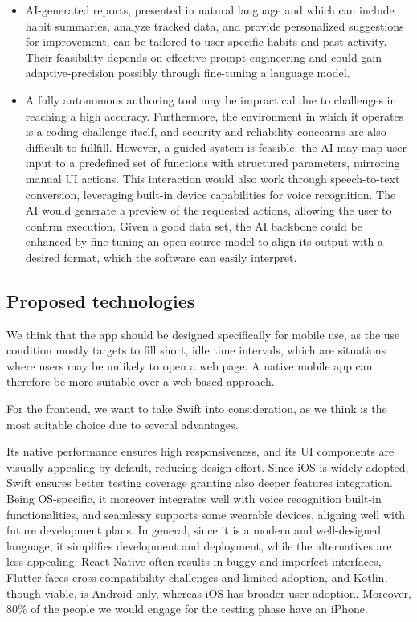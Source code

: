 \documentclass{article}
\begin{document}
\begin{itemize}

    \item AI-generated reports, presented in natural language and which can include habit summaries, analyze tracked data, and provide personalized suggestions for improvement, can be tailored to user-specific habits and past activity. Their feasibility depends on effective prompt engineering and could gain adaptive-precision possibly through fine-tuning a language model.

    \item A fully autonomous authoring tool may be impractical due to challenges in reaching a high accuracy. Furthermore, the environment in which it operates is a coding challenge itself, and security and reliability concearns are also difficult to fullfill.
    However, a guided system is feasible: the AI may map user input to a predefined set of functions with structured parameters, mirroring manual UI actions. This interaction would also work through speech-to-text conversion, leveraging built-in device capabilities for voice recognition. The AI would generate a preview of the requested actions, allowing the user to confirm execution.
    Given a good data set, the AI backbone could be enhanced by fine-tuning an open-source model to align its output with a desired format, which the software can easily interpret.

\end{itemize}

\subsection{Proposed technologies}

We think that the app should be designed specifically for mobile use, as the use condition mostly targets to fill short, idle time intervals, which are situations where users may be unlikely to open a web page.
A native mobile app can therefore be more suitable over a web-based approach.

For the frontend, we want to take Swift into consideration, as we think is the most suitable choice due to several advantages.

Its native performance ensures high responsiveness, and its UI components are visually appealing by default, reducing design effort.
Since iOS is widely adopted, Swift ensures better testing coverage granting also deeper features integration.
Being OS-specific, it moreover integrates well with voice recognition built-in functionalities, and seamlessy supports some wearable devices, aligning well with future development plans.
In general, since it is a modern and well-designed language, it simplifies development and deployment, while the alternatives are less appealing: React Native often results in buggy and imperfect interfaces, Flutter faces cross-compatibility challenges and limited adoption, and Kotlin, though viable, is Android-only, whereas iOS has broader user adoption.
Moreover, 80\% of the people we would engage for the testing phase have an iPhone.
\end{document}
